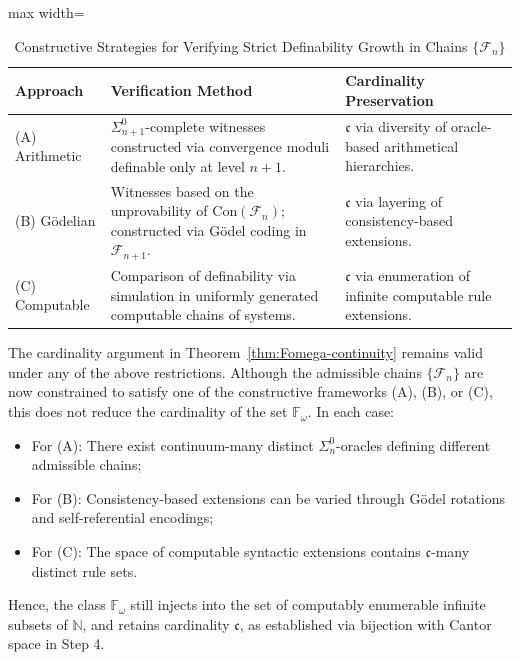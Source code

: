 \documentclass[12pt]{article}
\theoremstyle{definition}
\theoremstyle{plain}
\theoremstyle{remark}
\begin{document}
\begin{table}[ht]
\centering
\renewcommand{\arraystretch}{1.25}
\begin{adjustbox}{max width=\textwidth}
\begin{tabular}{@{} l p{8.8cm} p{6.4cm} @{}}
\toprule
\textbf{Approach} & \textbf{Verification Method} & \textbf{Cardinality Preservation} \\
\midrule
(A) Arithmetic &
\( \Sigma^0_{n+1} \)-complete witnesses constructed via convergence moduli definable only at level \( n+1 \). &
\( \mathfrak{c} \) via diversity of oracle-based arithmetical hierarchies. \\

(B) Gödelian &
Witnesses based on the unprovability of \( \mathrm{Con}(\mathcal{F}_n) \); constructed via Gödel coding in \( \mathcal{F}_{n+1} \). &
\( \mathfrak{c} \) via layering of consistency-based extensions. \\

(C) Computable &
Comparison of definability via simulation in uniformly generated computable chains of systems. &
\( \mathfrak{c} \) via enumeration of infinite computable rule extensions. \\
\bottomrule
\end{tabular}
\end{adjustbox}
\caption{Constructive Strategies for Verifying Strict Definability Growth in Chains \( \{\mathcal{F}_n\} \)}
\end{table}

The cardinality argument in Theorem~\ref{thm:Fomega-continuity} remains valid under any of the above restrictions. Although the admissible chains \( \{\mathcal{F}_n\} \) are now constrained to satisfy one of the constructive frameworks (A), (B), or (C), this does not reduce the cardinality of the set \( \mathbb{F}_\omega \). In each case:
\begin{itemize}
    \item For (A): There exist continuum-many distinct \( \Sigma^0_n \)-oracles defining different admissible chains;
    \item For (B): Consistency-based extensions can be varied through Gödel rotations and self-referential encodings;
    \item For (C): The space of computable syntactic extensions contains \( \mathfrak{c} \)-many distinct rule sets.
\end{itemize}

Hence, the class \( \mathbb{F}_\omega \) still injects into the set of computably enumerable infinite subsets of \( \mathbb{N} \), and retains cardinality \( \mathfrak{c} \), as established via bijection with Cantor space in Step 4.
\end{document}
